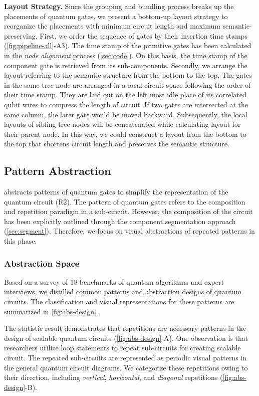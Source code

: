 \textbf{Layout Strategy.}
Since the grouping and bundling process breaks up the placements of quantum gates, we present a {bottom-up} layout strategy to reorganize the placements with minimum circuit length and maximum semantic-preserving.
First, we order the sequence of gates by their insertion time stamps (\cref{fig:pipeline-all}-A3). 
The time stamp of the primitive gates   has been calculated in the \emph{node alignment} process (\cref{sec:code}).
On this basis, the time stamp of the component gate  is retrieved from its sub-components.
Secondly, we arrange the layout referring to the semantic structure from the bottom to the top.
The gates in the same tree node are arranged in a local circuit space following the order of their time stamp.
They are laid out on the left most idle place of its correlated qubit wires  to compress the length of circuit.
If two gates are intersected at the same column, the later gate would be moved backward.
Subsequently, the local layouts of sibling tree nodes will be concatenated while calculating layout for their parent node.
In this way, we could construct a layout from the bottom to the top that shortens circuit length and preserves the semantic structure.



\subsection{Pattern Abstraction}
\label{sec:pattern-abs}
{\tname} abstracts patterns of quantum gates to simplify the representation of the quantum circuit ({R2}).
The pattern of quantum gates refers to the composition and repetition paradigm in a sub-circuit.
However, the composition of the circuit has been explicitly outlined through the component segmentation approach ({\cref{sec:segment}}).
Therefore, we focus on visual abstractions of repeated patterns in this phase.

\subsubsection{Abstraction Space}
\label{sec:abs-space}
Based on a survey of {18} benchmarks of quantum algorithms and expert interviews, we distilled common patterns and abstraction designs of quantum circuits.
The classification and visual representations for these patterns are summarized in \cref{fig:abs-design}.

The statistic result demonstrates that repetitions are necessary patterns in the design of scalable quantum circuits (\cref{fig:abs-design}-A).
One observation is that researchers utilize loop statements to repeat sub-circuits for creating scalable circuit.
The repeated sub-circuits are represented as periodic visual patterns in the general quantum circuit diagrams.
We categorize these repetitions owing to their direction, including \emph{vertical}, \emph{horizontal}, and \emph{diagonal} repetitions (\cref{fig:abs-design}-B).


